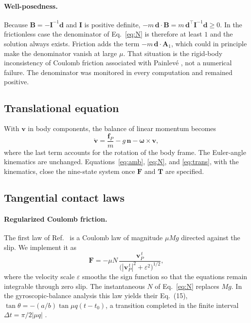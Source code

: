 \documentclass[aps,pre,twocolumn,superscriptaddress,amsmath,amssymb,floatfix,nofootinbib]{revtex4-2}
\newcommand{\ve}[1]{\bm{#1}}
\begin{document}
\paragraph*{Well-posedness.}
Because $\ve B=-\ve I^{-1}\ve d$ and $\ve I$ is positive definite,
$-m\,\ve d\cdot\ve B=m\,\ve d^{\top}\ve I^{-1}\ve d\ge0$. In the frictionless case the
denominator of Eq.~\eqref{eq:N} is therefore at least $1$ and the solution always exists.
Friction adds the term $-m\,\ve d\cdot\ve A_1$, which could in principle make the
denominator vanish at large $\mu$. That situation is the rigid-body inconsistency of
Coulomb friction associated with Painlev\'e \cite{Stewart2000}, not a numerical failure.
The denominator was monitored in every computation and remained positive.

\subsection{Translational equation}

With $\ve v$ in body components, the balance of linear momentum becomes
\begin{equation}
\mathring{\ve v}=\frac{\ve f_P}{m}-g\,\ve n-\bm\omega\times\ve v ,
\label{eq:trans}
\end{equation}
where the last term accounts for the rotation of the body frame. The Euler-angle
kinematics are unchanged. Equations~\eqref{eq:amb}, \eqref{eq:N}, and \eqref{eq:trans},
with the kinematics, close the nine-state system once $\ve F$ and $\ve T$ are specified.

\subsection{Tangential contact laws}\label{sec:laws}

\paragraph*{Regularized Coulomb friction.}
The first law of Ref.~\cite{Moffatt2002} is a Coulomb law of magnitude $\mu Mg$ directed
against the slip. We implement it as
\begin{equation}
\ve F=-\mu N\,\frac{\ve v_P^{\,t}}{\bigl(|\ve v_P^{\,t}|^2+\varepsilon^2\bigr)^{1/2}},
\label{eq:coulomb}
\end{equation}
where the velocity scale $\varepsilon$ smooths the sign function so that the equations
remain integrable through zero slip. The instantaneous $N$ of Eq.~\eqref{eq:N} replaces
$Mg$. In the gyroscopic-balance analysis this law yields their Eq.~(15),
$\tan\theta=-(a/b)\tan\mu q(t-t_0)$, a transition completed in the finite interval
$\Delta t=\pi/2|\mu q|$ \cite{Moffatt2002}.
\end{document}

